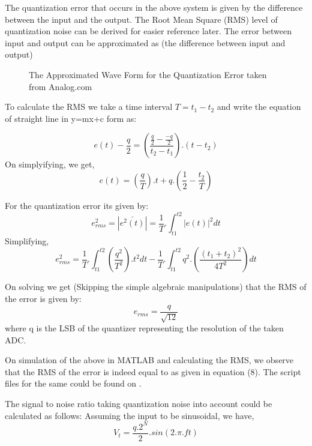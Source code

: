 \documentclass[colorlinks=true,pdfstartview=FitV,linkcolor=blue,
            citecolor=red,urlcolor=magenta]{ligodoc}
\begin{document}
The quantization error that occurs in the above system is given by the difference between the input and the output. The Root Mean Square (RMS) level of quantization noise can be derived for easier reference later.
The error between input and output can be approximated as (the difference between input and output)

 \begin{figure}[htbp]
 
  \centering
  
  \caption{The Approximated Wave Form for the Quantization Error taken from Analog.com}
 
\end{figure}

To calculate the RMS we take a time interval $T = t_{1}-t_{2}$ and write the equation of straight line in y=mx+c form as:

\begin{equation}
e(t)-\frac{q}{2}=\left(\frac{\frac{q}{2}-\frac{-q}{2}}{t_{2}-t_{1}}\right).(t-t_{2})
\end{equation}
On simplyifying, we get,
\begin{equation}
e(t)=\left(\frac{q}{T}\right).t + q .\left(\frac{1}{2}-\frac{t_{2}}{T}\right)
\end{equation}

For the quantization error its given by: 
\begin{equation}
e_{rms}^{2}=\left|\bar{e^{2}(t)}\right|=\frac{1}{T}.\int_{t1}^{t2} \left|e(t)\right|^{2} dt
\end{equation}
Simplifying,
\begin{equation}
e_{rms}^{2}=\frac{1}{T}.\int_{t1}^{t2} \left(\frac{q^{2}}{T^{2}}\right).t^{2} dt  -\frac{1}{T}.\int_{t1}^{t2} q^{2}.\left(\frac{(t_{1}+t_{2})^{2}}{4T^{2}}\right) dt
\end{equation}

On solving we get (Skipping the simple algebraic manipulations) that the RMS of the error is given by:
\begin{equation}
e_{rms}=\frac{q}{\sqrt{12}}
\end{equation}
where q is the LSB of the quantizer representing the resolution of the taken ADC.

On simulation of the above in MATLAB and calculating the RMS, we observe that the RMS of the error is indeed equal to as given in equation (8). The script files for the same could be found on \cite{Git}.

The signal to noise ratio taking quantization noise into account could be calculated as follows:
Assuming the input to be sinusoidal, we have, 
\begin{equation}
V_{t} = \frac{q. 2^{N}}{2} . sin(2.\pi .ft)
\end{equation}
\end{document}
